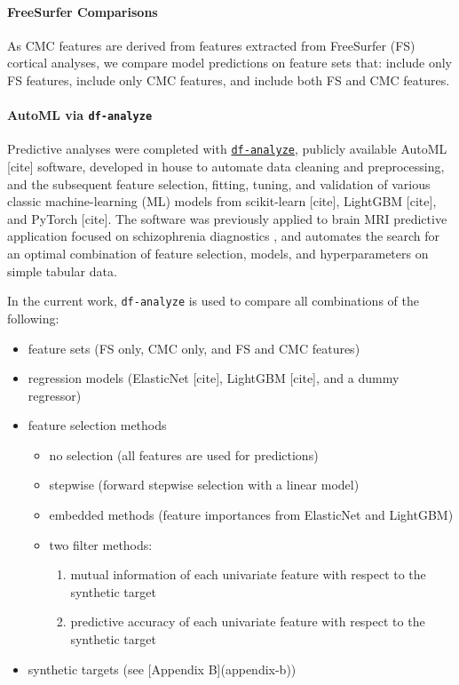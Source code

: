 \documentclass{article}
\begin{document}
\paragraph{FreeSurfer Comparisons}

As CMC features are derived from features extracted from FreeSurfer (FS)
cortical analyses, we compare model predictions on feature sets that: include
only FS features, include only CMC features, and include both FS and CMC
features.

\paragraph{AutoML via \texttt{df-analyze}}


Predictive analyses were completed with
\href{github.com/stfxecutables/df-analyze}{\texttt{df-analyze}}, publicly
available AutoML [cite] software, developed in house to automate data
cleaning and preprocessing, and the subsequent feature selection, fitting,
tuning, and validation of various classic machine-learning (ML) models from
scikit-learn [cite], LightGBM [cite], and PyTorch [cite]. The software was
previously applied to brain MRI predictive application focused on
schizophrenia diagnostics \citep{levmanMorphologicalStudySchizophrenia2022},
and automates the search for an optimal combination of feature selection,
models, and hyperparameters on simple tabular data.

In the current work, \texttt{df-analyze} is used to compare all combinations
of the following:

\begin{itemize}
\item feature sets (FS only, CMC only, and FS and CMC features)
\item regression models (ElasticNet [cite], LightGBM [cite], and a dummy regressor)
\item feature selection methods
	\begin{itemize}
		\item no selection (all features are used for predictions)
		\item stepwise (forward stepwise selection with a linear model)
		\item embedded methods (feature importances from ElasticNet and LightGBM)
		\item two filter methods:
		\begin{enumerate}
			\item mutual information of each univariate feature with respect to the synthetic target
			\item predictive accuracy of each univariate feature with respect to the synthetic target
		\end{enumerate}
	\end{itemize}
\item synthetic targets (see [Appendix B](appendix-b))
\end{itemize}
\end{document}
